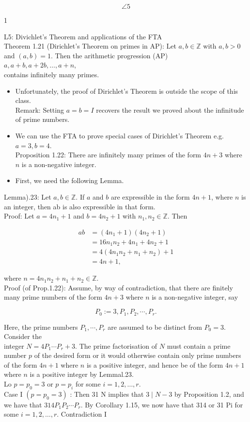 \documentclass[10pt]{article}
\begin{document}
$$
\angle 5
$$

1

L5: Divichlet's Theorem and applications of the FTA\\
Theorem 1.21 (Dirichlet's Theorem on primes in AP): Let $a, b \in \mathbb{Z}$ with $a, b>0$ and $(a, b)=1$. Then the arithmetic progression (AP)\\
$a, a+b, a+2 b, \ldots, a+n$,\\
contains infinitely many primes.

\begin{itemize}
  \item Unfortunately, the proof of Dirichlet's Theorem is outside the scope of this class.\\
Remark: Setting $a=b=I$ recovers the result we proved about the infinitude of prime numbers.
  \item We can use the FTA to prove special cases of Dirichlet's Theorem e.g. $a=3, b=4$.\\
Proposition 1.22: There are infinitely many primes of the form $4 n+3$ where $n$ is a non-negative integer.
  \item First, we need the following Lemma.
\end{itemize}

Lemma).23: Let $a, b \in \mathbb{Z}$. If $a$ and $b$ are expressible in the form $4 n+1$, where $n$ is an integer, then ab is also expressible in that form.\\
Proof: Let $a=4 n_{1}+1$ and $b=4 n_{2}+1$ with $n_{1}, n_{2} \in \mathbb{Z}$. Then

$$
\begin{aligned}
a b & =\left(4 n_{1}+1\right)\left(4 n_{2}+1\right) \\
& =16 n_{1} n_{2}+4 n_{1}+4 n_{2}+1 \\
& =4\left(4 n_{1} n_{2}+n_{1}+n_{2}\right)+1 \\
& =4 n+1,
\end{aligned}
$$

where $n=4 n_{1} n_{2}+n_{1}+n_{2} \in \mathbb{Z}$.\\
Proof (of Prop.1.22): Assume, by way of contradiction, that there are finitely many prime numbers of the form $4 n+3$ where $n$ is a non-negative integer, say

$$
P_{0}:=3, P_{1}, P_{2}, \cdots, P_{r} .
$$

Here, the prime numbers $P_{1}, \cdots, P_{r}$ are assumed to be distinct from $P_{0}=3$. Consider the\\
integer $N=4 P_{1} \cdots P_{r}+3$. The prime factorisation of $N$ must contain a prime number $p$ of the desired form or it would otherwise contain only prime numbers of the form $4 n+1$ where $n$ is a positive integer, and hence be of the form $4 n+1$ where $n$ is a positive integer by Lemmal.23.\\
Lo $p=p_{0}=3$ or $p=p_{i}$ for some $i=1,2, \ldots, r$.\\
Case I $\left(p=p_{0}=3\right)$ : Then 31 N implies that $3 \mid N-3$ by Proposition 1.2, and we have that $314 P_{1} P_{2} \cdots P_{r}$. By Corollary 1.15, we now have that 314 or 31 Pi for some $i=1,2, \ldots, r$. Contradiction I
\end{document}
